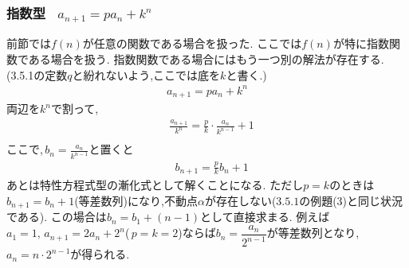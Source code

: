   \subsubsection{指数型  \, $\displaystyle a_{n+1}=pa_n+k^n$}
    前節では$f(n)$が任意の関数である場合を扱った.
    ここでは$f(n)$が特に指数関数である場合を扱う.
    指数関数である場合にはもう一つ別の解法が存在する.\,(3.5.1の定数$q$と紛れないよう,ここでは底を$k$と書く.)
    \begin{align*}
      a_{n+1}=pa_n+k^n
    \end{align*}
    両辺を$k^n$で割って,
    \begin{align*}      
      &\frac{a_{n+1}}{k^n}=\frac{p}{k}\cdot\frac{a_n}{k^{n-1}}+1\\
    \end{align*}
    ここで,\,$b_n=\frac{a_n}{k^{n-1}}$と置くと
    \begin{align*}
      &b_{n+1}=\frac{p}{k}b_n+1
    \end{align*}
    あとは特性方程式型の漸化式として解くことになる.
    ただし$p=k$のときは$b_{n+1}=b_n+1$(等差数列)になり,不動点$\alpha$が存在しない($3.5.1$の例題(3)と同じ状況である).
    この場合は$b_n=b_1+(n-1)$として直接求まる.
    例えば$a_1=1,\,a_{n+1}=2a_n+2^n$(\,$p=k=2$)ならば$b_n=\dfrac{a_n}{2^{n-1}}$が等差数列となり,\,$a_n=n\cdot2^{n-1}$が得られる.
